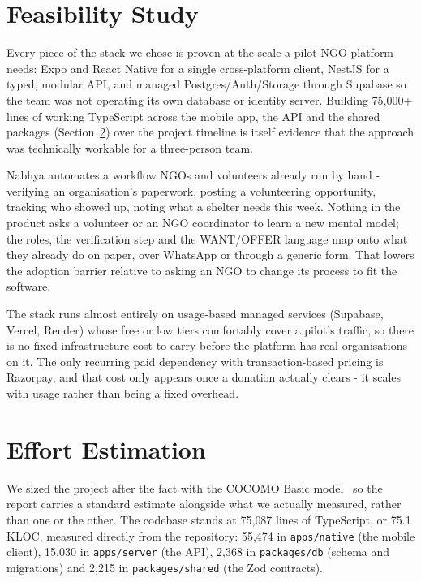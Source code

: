 \section{Feasibility Study}
\label{sec:feasibility}
\begin{description}[leftmargin=0pt, itemindent=0pt, labelsep=0.4em, font=\bfseries]
  \item[Technical feasibility.] Every piece of the stack we chose is proven at the scale a pilot NGO platform needs: Expo and React Native for a single cross-platform client, NestJS for a typed, modular API, and managed Postgres/Auth/Storage through Supabase so the team was not operating its own database or identity server. Building 75{,}000+ lines of working TypeScript across the mobile app, the API and the shared packages (Section~\ref{sec:effort-estimation}) over the project timeline is itself evidence that the approach was technically workable for a three-person team.
  \item[Operational feasibility.] Nabhya automates a workflow NGOs and volunteers already run by hand - verifying an organisation's paperwork, posting a volunteering opportunity, tracking who showed up, noting what a shelter needs this week. Nothing in the product asks a volunteer or an NGO coordinator to learn a new mental model; the roles, the verification step and the WANT/OFFER language map onto what they already do on paper, over WhatsApp or through a generic form. That lowers the adoption barrier relative to asking an NGO to change its process to fit the software.
  \item[Economic feasibility.] The stack runs almost entirely on usage-based managed services (Supabase, Vercel, Render) whose free or low tiers comfortably cover a pilot's traffic, so there is no fixed infrastructure cost to carry before the platform has real organisations on it. The only recurring paid dependency with transaction-based pricing is Razorpay, and that cost only appears once a donation actually clears - it scales with usage rather than being a fixed overhead.
\end{description}

\section{Effort Estimation}
\label{sec:effort-estimation}
We sized the project after the fact with the COCOMO Basic model~\cite{boehm1981} so the report carries a standard estimate alongside what we actually measured, rather than one or the other. The codebase stands at 75{,}087 lines of TypeScript, or 75.1 KLOC, measured directly from the repository: 55{,}474 in \texttt{apps/native} (the mobile client), 15{,}030 in \texttt{apps/server} (the API), 2{,}368 in \texttt{packages/db} (schema and migrations) and 2{,}215 in \texttt{packages/shared} (the Zod contracts).

